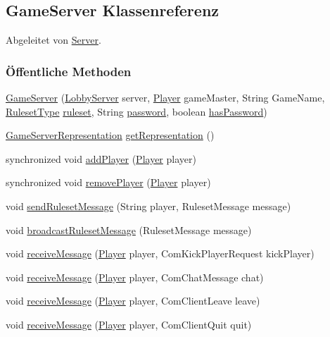 \hypertarget{a00072}{\subsection{Game\-Server Klassenreferenz}
\label{a00072}
}


Abgeleitet von \hyperlink{a00077}{Server}.

\subsubsection*{Öffentliche Methoden}
\begin{DoxyCompactItemize}
\item 
\hyperlink{a00072_ae17f12e5a1a3e12eef025dea863879ac}{Game\-Server} (\hyperlink{a00074}{Lobby\-Server} server, \hyperlink{a00076}{Player} game\-Master, String Game\-Name, \hyperlink{a00066}{Ruleset\-Type} \hyperlink{a00072_a67a78e259859051426c3ad7f1a67f143}{ruleset}, String \hyperlink{a00072_acbd76b816d055b7a642c219fd9751020}{password}, boolean \hyperlink{a00072_aeb207819150d367d4c5b73beaec78e52}{has\-Password})
\item 
\hyperlink{a00073}{Game\-Server\-Representation} \hyperlink{a00072_a3552c90bf00c53fb602150e1b5686eeb}{get\-Representation} ()
\item 
synchronized void \hyperlink{a00072_ac0a0163cec54e6202131c76962d7834b}{add\-Player} (\hyperlink{a00076}{Player} player)
\item 
synchronized void \hyperlink{a00072_a8b2712c19a20e54b3c5d99ce9d21112e}{remove\-Player} (\hyperlink{a00076}{Player} player)
\item 
void \hyperlink{a00072_a07aa6899fcfc25047d035eb18da2b4cf}{send\-Ruleset\-Message} (String player, Ruleset\-Message message)
\item 
void \hyperlink{a00072_a73d0d14c3d9e05fe191d56f3c2b49721}{broadcast\-Ruleset\-Message} (Ruleset\-Message message)
\item 
void \hyperlink{a00072_a0b77fc3205ccec25f53c3e75b22472e0}{receive\-Message} (\hyperlink{a00076}{Player} player, Com\-Kick\-Player\-Request kick\-Player)
\item 
void \hyperlink{a00072_a35ab43e0cc0ed85898cf687d29d79d82}{receive\-Message} (\hyperlink{a00076}{Player} player, Com\-Chat\-Message chat)
\item 
void \hyperlink{a00072_a52c32a89be29c3e3a2d4ea6df83517df}{receive\-Message} (\hyperlink{a00076}{Player} player, Com\-Client\-Leave leave)
\item 
void \hyperlink{a00072_a9d96ab623d7989576a1d610ec6efe98a}{receive\-Message} (\hyperlink{a00076}{Player} player, Com\-Client\-Quit quit)

\end{DoxyCompactItemize}
